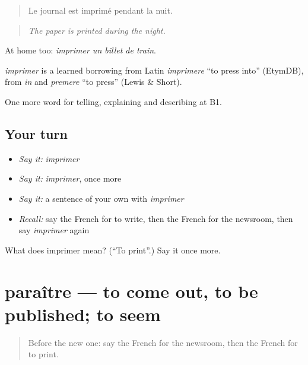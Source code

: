 \begin{quote}
Le journal est imprimé pendant la nuit.
\end{quote}

\begin{quote}
\emph{The paper is printed during the night.}
\end{quote}

At home too: \emph{imprimer un billet de train}.

\begin{cousinweb}
\emph{imprimer} is a learned borrowing from Latin \emph{imprimere} \textquotedblleft{}to press into\textquotedblright{} (EtymDB), from \emph{in} and \emph{premere} \textquotedblleft{}to press\textquotedblright{} (Lewis \& Short).
\end{cousinweb}

\begin{grammarlens}[title={What you've built}]
One more word for telling, explaining and describing at B1.
\end{grammarlens}

\subsection*{Your turn}
\begin{itemize}
\raggedright
  \item \emph{Say it:} \emph{imprimer}
  \item \emph{Say it:} \emph{imprimer}, once more
  \item \emph{Say it:} a sentence of your own with \emph{imprimer}
  \item \emph{Recall:} say the French for to write, then the French for the newsroom, then say \emph{imprimer} again
\end{itemize}

\begin{tcolorbox}[breakable,colback=teal!4,colframe=teal!35!black,title={Before you move on}]
What does imprimer mean? (\textquotedblleft{}To print\textquotedblright{}.) Say it once more.
\end{tcolorbox}
\section[paraître]{paraître — to come out, to be published; to seem}

\label{lesson:FR-C279-paraitre}



\begin{quote}
Before the new one: say the French for the newsroom, then the French for to print.
\end{quote}

